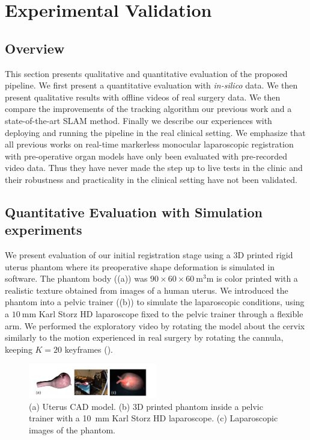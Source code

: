 
\section{Experimental Validation}
\label{sec:experiments}
\subsection{Overview}
This section presents qualitative and quantitative evaluation of the proposed pipeline. We first present a quantitative evaluation with \textit{in-silico} data. We then present qualitative results with offline videos of real surgery data. We then compare the improvements of the tracking algorithm \wrt our previous work and a state-of-the-art SLAM method. Finally we describe our experiences with deploying and running the pipeline in the real clinical setting. We emphasize that all previous works on real-time markerless monocular laparoscopic registration with pre-operative organ models have only been evaluated with pre-recorded video data. Thus they have never made the step up to live tests in the clinic and their robustness and practicality in the clinical setting have not been validated. 

\subsection{Quantitative Evaluation with Simulation experiments}
\label{sec:experiments_Simulation}
We present evaluation of our initial registration stage using a 3D printed rigid uterus phantom where its preoperative shape deformation is simulated in software.
The phantom body ((a)) was $90 \times 60 \times 60~\si{\cubic\milli\metre}$ is color printed with a realistic texture obtained from images of a human uterus. We introduced the phantom into a pelvic trainer ((b)) to simulate the laparoscopic conditions, using a $\SI{10}{\milli\metre}$ Karl Storz HD laparoscope fixed to the pelvic trainer through a flexible arm. We performed the exploratory video by rotating the model about the cervix similarly to the motion experienced in real surgery by rotating the cannula, keeping $K=20$ keyframes ().
 
\begin{figure}[t]
  \centering
  \includegraphics[width=0.5\textwidth]{./figs/phantom.pdf}
\caption{(a) Uterus CAD model. (b) 3D printed phantom inside a pelvic trainer with a \SI{10}{\milli\metre} Karl Storz HD laparoscope. (c) Laparoscopic images of the phantom.}
\label{fig:phantom}
\end{figure}


